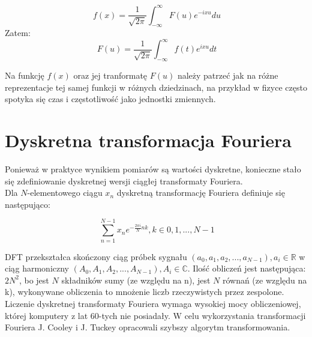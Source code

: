 \documentclass{article}
\begin{document}
\begin{equation} \label{eu_eqn} \
f(x) = \frac{1}{\sqrt{2\pi}}\int_{-\infty}^{\infty}F(u)e^{-ixu}du
\end{equation}
Zatem:
\begin{equation} \label{eu_eqn} \
F(u) = \frac{1}{\sqrt{2\pi}}\int_{-\infty}^{\infty}f(t)e^{ixu}dt
\end{equation}

Na funkcję $f(x)$ oraz jej tranformatę $F(u)$ należy patrzeć jak na różne reprezentacje tej samej funkcji w różnych dziedzinach, na przykład w fizyce często spotyka się czas i częstotliwość jako jednostki zmiennych.

\section{Dyskretna transformacja Fouriera}
Ponieważ w praktyce wynikiem pomiarów są wartości dyskretne, konieczne stało się zdefiniowanie dyskretnej wersji ciągłej transformaty Fouriera. \\Dla $N$-elementowego ciągu $x_{n}$ dyskretną transformację Fouriera definiuje się następująco:


\begin{equation} \label{eu_eqn} \
\sum_{n=1}^{N-1} x_{n}e^{-\frac{2\pi i}{N}nk}, k \in {0, 1,...,N-1}
\end{equation}

DFT przekształca skończony ciąg próbek sygnału \newline $(a_{0}, a_{1}, a_{2},...,a_{N-1}), a_{i} \in \mathbb{R}$ w ciąg harmoniczny $(A_{0}, A_{1}, A_{2},...,A_{N-1}), A_{i} \in \mathbb{C}$. Ilość obliczeń jest następująca: $2N^2$, bo jest $N$ składników sumy (ze względu na n), jest $N$ równań (ze względu na k), wykonywane obliczenia to mnożenie liczb rzeczywistych przez zespolone. Liczenie dyskretnej transformaty Fouriera wymaga wysokiej mocy obliczeniowej, której komputery z lat 60-tych nie posiadały. W celu wykorzystania transformacji Fouriera J. Cooley i J. Tuckey opracowali szybszy algorytm transformowania.
\newpage
\end{document}
